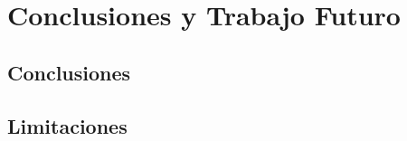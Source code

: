 
\chapter{Conclusiones y Trabajo Futuro}
\label{cap:conclusiones}



\section{Conclusiones}
\label{sec:conclusiones}



\section{Limitaciones}
\label{sec:limitaciones}


